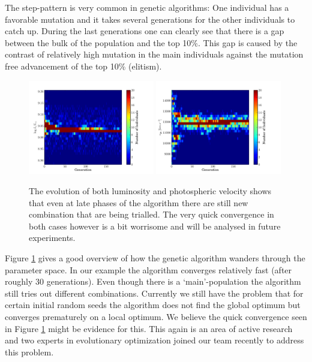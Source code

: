 The step-pattern is very common in genetic algorithms: One individual has a favorable mutation and it takes several generations for the other \glspl{individual} to catch up. During the last generations one can clearly see that there is a gap between the bulk of the population and the top 10\%. This gap is caused by the contrast of relatively high mutation in the main individuals against the mutation free advancement of the top 10\% (\gls{elitism}).


\begin{figure}[htbp] %
   \centering
   \includegraphics[width=0.49\textwidth]{chapter_dalek/plots/plot_02bo_lum_evol.pdf} 
   \includegraphics[width=0.49\textwidth]{chapter_dalek/plots/plot_02bo_vph_evol.pdf} 
   \caption{The evolution of both luminosity and photospheric velocity shows that even at late phases of the algorithm there are still new combination that are being trialled. The very quick convergence in both cases however is a bit worrisome and will be analysed in future experiments.}
   \label{fig:lumvph_evolution}
\end{figure}


Figure \ref{fig:lumvph_evolution} gives a good overview of how the genetic algorithm wanders through the parameter space. In our example the algorithm converges relatively fast (after roughly 30 generations). Even though there is a `main'-population the algorithm still tries out different combinations. Currently we still have the problem that for certain initial random seeds the algorithm does not find the global optimum but converges prematurely on a local optimum. We believe the quick convergence seen in Figure \ref{fig:lumvph_evolution} might be evidence for this. This again is an area of active research and two experts in evolutionary optimization joined our team recently to address this problem. 

